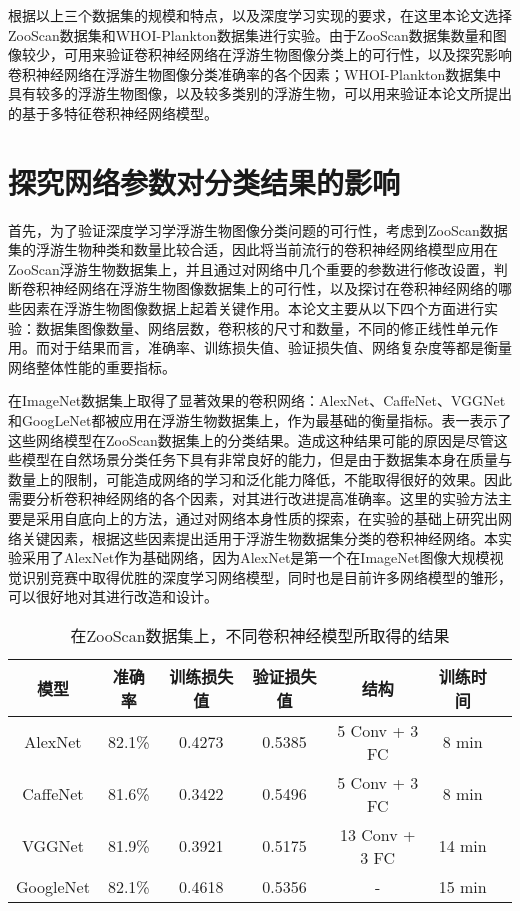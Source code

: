 根据以上三个数据集的规模和特点，以及深度学习实现的要求，在这里本论文选择ZooScan数据集和WHOI-Plankton数据集进行实验。由于ZooScan数据集数量和图像较少，可用来验证卷积神经网络在浮游生物图像分类上的可行性，以及探究影响卷积神经网络在浮游生物图像分类准确率的各个因素；WHOI-Plankton数据集中具有较多的浮游生物图像，以及较多类别的浮游生物，可以用来验证本论文所提出的基于多特征卷积神经网络模型。

\section{探究网络参数对分类结果的影响}

首先，为了验证深度学习学浮游生物图像分类问题的可行性，考虑到ZooScan数据集的浮游生物种类和数量比较合适，因此将当前流行的卷积神经网络模型应用在ZooScan浮游生物数据集上，并且通过对网络中几个重要的参数进行修改设置，判断卷积神经网络在浮游生物图像数据集上的可行性，以及探讨在卷积神经网络的哪些因素在浮游生物图像数据上起着关键作用。本论文主要从以下四个方面进行实验：数据集图像数量、网络层数，卷积核的尺寸和数量，不同的修正线性单元作用。而对于结果而言，准确率、训练损失值、验证损失值、网络复杂度等都是衡量网络整体性能的重要指标。

在ImageNet数据集上取得了显著效果的卷积网络：AlexNet、CaffeNet、VGGNet和GoogLeNet都被应用在浮游生物数据集上，作为最基础的衡量指标。表一表示了这些网络模型在ZooScan数据集上的分类结果。造成这种结果可能的原因是尽管这些模型在自然场景分类任务下具有非常良好的能力，但是由于数据集本身在质量与数量上的限制，可能造成网络的学习和泛化能力降低，不能取得很好的效果。因此需要分析卷积神经网络的各个因素，对其进行改进提高准确率。这里的实验方法主要是采用自底向上的方法，通过对网络本身性质的探索，在实验的基础上研究出网络关键因素，根据这些因素提出适用于浮游生物数据集分类的卷积神经网络。本实验采用了AlexNet作为基础网络，因为AlexNet是第一个在ImageNet图像大规模视觉识别竞赛中取得优胜的深度学习网络模型，同时也是目前许多网络模型的雏形，可以很好地对其进行改造和设计。

\begin{table}[H]
\centering
\caption{在ZooScan数据集上，不同卷积神经模型所取得的结果}
\label{comparison}
\vspace{0.2em}
\begin{tabular}{|c|c|c|c|c|c|c|}
\hline 模型 & 准确率 & 训练损失值 & 验证损失值 & 结构 & 训练时间\\ 
\hline AlexNet  & 82.1\% & 0.4273 & 0.5385 & 5 Conv + 3 FC &  8 min\\
\hline CaffeNet & 81.6\% & 0.3422 & 0.5496 & 5 Conv + 3 FC &  8 min\\
\hline VGGNet  & 81.9\% & 0.3921 & 0.5175 & 13 Conv + 3 FC &  14 min\\
\hline GoogleNet & 82.1\% & 0.4618 & 0.5356 & -  & 15 min\\
\hline  
\end{tabular}
\end{table}


